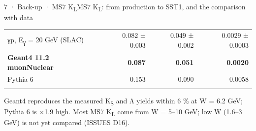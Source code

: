\begin{btframe}{7 · Back-up · MS7 K\textsubscript{L}}{MS7 K\textsubscript{L}: from production to SST1, and the comparison with data}
\begin{minipage}[t]{\dimexpr(0.4444\linewidth-0.4444\dimexpr9.67pt\relax)}
{\begin{tabularx}{\linewidth}{>{\raggedright\arraybackslash}Xrrr}
γp, E\textsubscript{γ} = 20 GeV (SLAC) & 0.082 ± 0.003 & 0.049 ± 0.002 & 0.0029 ± 0.0003 \\\rowrule
\rowcolor{tint}\bfseries Geant4 11.2 muonNuclear & \bfseries 0.087 & \bfseries 0.051 & \bfseries 0.0020 \\\rowrule
Pythia 6 & 0.153 & 0.090 & 0.0058 \\\rowrule
\end{tabularx}\par}
\vspace{2.46pt}
{\fontsize{4.78pt}{6.45pt}\selectfont Geant4 reproduces the measured K\textsubscript{S} and Λ yields within 6 \% at W = 6.2 GeV; Pythia 6 is ×1.9 high. Most MS7 K\textsubscript{L} come from W = 5–10 GeV; low W (1.6–3 GeV) is not yet compared (ISSUES D16).\par}
\end{minipage}\par
\end{btframe}

